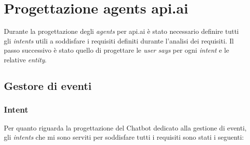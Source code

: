 \section{Progettazione agents api.ai}
Durante la progettazione degli \emph{agents} per api.ai è stato necessario definire tutti gli \emph{intents} utili a soddisfare i requisiti definiti durante l'analisi dei requisiti. Il passo successivo è stato quello di progettare le \emph{user says} per ogni \emph{intent} e le relative \emph{entity}.

\subsection{Gestore di eventi}
\subsubsection{Intent}
Per quanto riguarda la progettazione del \gls{Chatbot} dedicato alla gestione di eventi, gli \emph{intents} che mi sono serviti per soddisfare tutti i requisiti sono stati i seguenti:
